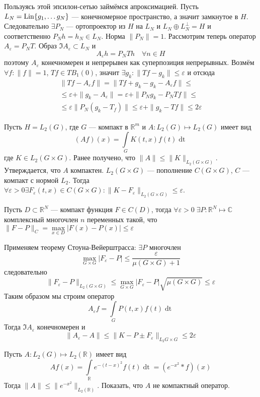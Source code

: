\documentclass[14pt]{extarticle}
\begin{document}
\begin{Proof}
    Пользуясь этой эпсилон-сетью займёмся апроксимацией.
    Пусть $L_N = \operatorname{Lin} \{g_1,\dots g_N\}$ --- конечномерное пространство, а
    значит замкнутое в $H$.
    Следовательно $\exists P_N$ --- ортопроектор из $H$ на $L_N$ и 
    $L_N \oplus L_N^\perp = H$ и соответственно $P_N h = h_N \in L_N$.
    Норма $\|P_N\| = 1$.
    Рассмотрим теперь оператор $A_\varepsilon = P_N T$.
    Образ $\Im A_\varepsilon \subset L_N$ и
    $$
    A_\varepsilon h = P_N T h \quad \forall n \in H
    $$
    поэтому $A_\varepsilon$ конечномерен и непрерывен как суперпозиция 
    непрерывных.
    Возмём $\forall f\colon \|f\| = 1$, $Tf \in TB_1(0)$, значит
    $\exists g_k\colon \|Tf - g_k\| \le \varepsilon$ и отсюда
    \begin{multline*}
    \|Tf - A_\varepsilon f\| = \|Tf + g_k - g_k - A_\varepsilon f\| \le \\ \le
    \varepsilon + \|g_k - A_\varepsilon\| = \varepsilon + \|P_N g_k - P_N T f\|
    \le \\ \le\varepsilon  \|P_N(g_k - T_f)\| \le \varepsilon + \|g_k - Tf\| 
    \le 2 \varepsilon 
    \end{multline*}
\end{Proof}
\begin{Prim}
    Пусть $H = L_2(G)$, где $G$ --- компакт в $\mathbb R^m$ и $A : L_2(G)
    \mapsto L_2(G)$ имеет вид
    $$
    (Af)(x) = \int\limits_G K(t, x)f(t)\mathop{dt}
    $$
    где $K \in L_2(G \times G)$.
    Ранее получено, что $\|A\| \le \|K\|_{L_2(G \times G)}$.
    Утверждается, что $A$ компактен.
    $L_2(G \times G)$ --- пополнение $C(G \times G)$, $C$ --- компакт с нормой
    $L_2$.
    Тогда $\forall \varepsilon > 0 \exists F_\varepsilon(t, x) \in
    C(G \times G)\colon \|K - F_\varepsilon\|_{L_2(G \times G)} \le 
    \varepsilon$.
    \begin{Theor}
        Пусть $D \subset \mathbb R^N$ --- компакт функция $F \in C(D)$, тогда
        $\forall \varepsilon > 0\; \exists P : \mathbb R^N \mapsto \mathbb C$
        комплексный многочлен $n$ переменных такой, что
        $\|F - P\|_C = \max\limits_{x \in D} |F(x) - P(x)| \le \varepsilon$
    \end{Theor}
    
    Применяем теорему Стоуна-Вейерштрасса: $\exists P$ многочлен
    $$
    \max_{G \times G}|F_\varepsilon - P| \le \dfrac{\varepsilon}{\mu(G \times 
    G) + 1}
    $$
    следовательно
    $$
    \|F_\varepsilon - P\|_{L_2(G \times G)} \le \max_{G \times G}|F_\varepsilon 
    - P|\sqrt{\mu(G \times G)} \le \varepsilon
    $$
    Таким образом мы строим оператор
    $$
    A_\varepsilon f = \int \limits_G P(t, x) f(t) \mathop{dt}
    $$
    Тогда $\Im A_\varepsilon$ конечномерен и
    $$
    \|A_\varepsilon - A\| \le \|K - P \pm F_\varepsilon\|_{L_2{G \times G}} \le
    2 \varepsilon
    $$
\end{Prim}
\begin{Upr}
    Пусть $A : L_2(G) \mapsto L_2(\mathbb R)$ имеет вид
    $$
    Af(x) = \int\limits_{\mathbb R} e^{-(t - x)^2}f(t)\mathop{dt} = (e^{-x^2} *
    f)(x)
    $$
    Тогда $\|A\| \le \|e^{-x^2}\|_{L_2(\mathbb R)}$. 
    Показать, что $A$ не компактный оператор.
\end{Upr}
\end{document}
